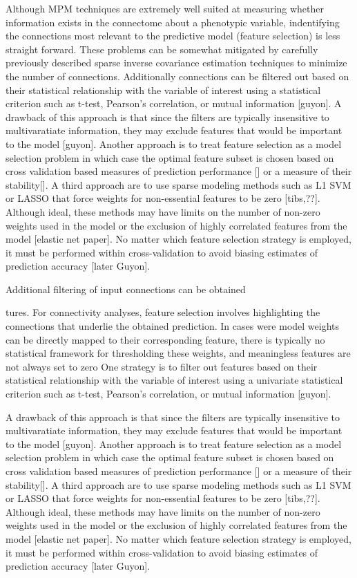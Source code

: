 \documentclass[5p]{elsarticle}
\begin{document}
Although MPM techniques are extremely well suited at measuring whether
information exists in the connectome about a phenotypic variable, indentifying the
connections most relevant to the predictive model (feature selection) is less straight forward. 
These problems can be somewhat mitigated by carefully previously described
sparse inverse covariance estimation techniques to minimize the number of
connections. Additionally connections can be filtered out based on their statistical relationship with the variable of
interest using a statistical criterion such as t-test, Pearson's
correlation, or mutual information [guyon].  
A drawback of this approach is that
since the filters are typically insensitive to multivaratiate information, they
may exclude features that would be important to the model [guyon]. Another
approach is to treat feature selection as a model selection problem in which
case the optimal feature subset is chosen based on cross validation based
measures of prediction performance [] or a measure of their stability[].  A
third approach are to use sparse modeling methods such as L1 SVM or LASSO that
force weights for non-essential features to be zero [tibs,??]. Although ideal,
these methods may have limits on the number of non-zero weights used in the
model or the exclusion of highly correlated features from the model [elastic net
paper].  No matter
which feature selection strategy is employed, it must be performed within
cross-validation to avoid biasing estimates of prediction accuracy [later
Guyon].
 

Additional filtering of input connections can be obtained 

tures.  For connectivity analyses, feature
selection involves highlighting the connections that underlie the obtained
prediction.  In cases were model weights can be directly mapped to their
corresponding feature, there is typically no statistical framework for
thresholding these weights, and meaningless features are not always set to zero
One strategy is to filter out features based on their statistical relationship with the variable of
interest using a univariate statistical criterion such as t-test, Pearson's
correlation, or mutual information [guyon].  

A drawback of this approach is that
since the filters are typically insensitive to multivaratiate information, they
may exclude features that would be important to the model [guyon]. Another
approach is to treat feature selection as a model selection problem in which
case the optimal feature subset is chosen based on cross validation based
measures of prediction performance [] or a measure of their stability[].  A
third approach are to use sparse modeling methods such as L1 SVM or LASSO that
force weights for non-essential features to be zero [tibs,??]. Although ideal,
these methods may have limits on the number of non-zero weights used in the
model or the exclusion of highly correlated features from the model [elastic net
paper].  No matter
which feature selection strategy is employed, it must be performed within
cross-validation to avoid biasing estimates of prediction accuracy [later
Guyon].
\end{document}
